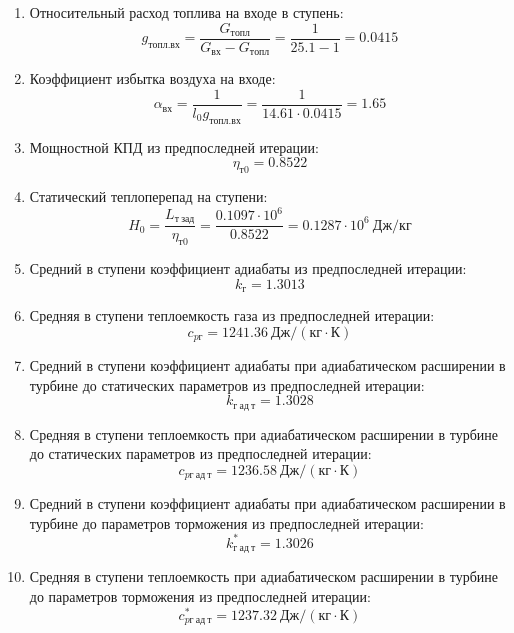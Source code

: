\documentclass[a4paper,10pt]{article}
\begin{document}
    

    \begin{enumerate}

        \item Относительный расход топлива на входе в ступень:
        \[
            g_{топл.вх} = \frac{ G_{топл} }{ G_{вх} - G_{топл} } =
                \frac{ 1 }{ 25.1 - 1 } =
            0.0415
        \]

        \item Коэффициент избытка воздуха на входе:
        \[
            \alpha_{вх} = \frac{ 1 }{ l_0 g_{топл.вх} } =
                \frac{ 1 }{ 14.61 \cdot 0.0415 } =
            1.65
        \]

        \item Мощностной КПД из предпоследней итерации:
        \[
            \eta_{т0} = 0.8522
        \]

        \item Статический теплоперепад на ступени:
        \[
            H_0 = \frac{L_{т\ зад}}{\eta_{т0}} =
                \frac{ 0.1097 \cdot 10^6 }{ 0.8522 } =
            0.1287 \cdot 10^6 \ Дж/кг
        \]

        \item Средний в ступени коэффициент адиабаты из предпоследней итерации:
        \[
            k_г = 1.3013
        \]

        \item Средняя в ступени теплоемкость газа из предпоследней итерации:
        \[
            c_{pг} = 1241.36 \ Дж/(кг \cdot К)
        \]

        \item Средний в ступени коэффициент адиабаты при адиабатическом расширении в турбине до статических параметров из предпоследней итерации:
        \[
            k_{г\ ад\ т} = 1.3028
        \]

        \item Средняя в ступени теплоемкость при адиабатическом расширении в турбине до статических параметров из предпоследней итерации:
        \[
            c_{pг\ ад\ т} = 1236.58 \ Дж/(кг \cdot К)
        \]

        \item Средний в ступени коэффициент адиабаты при адиабатическом расширении в турбине до параметров торможения из предпоследней итерации:
        \[
            k_{г\ ад\ т}^* = 1.3026
        \]

        \item Средняя в ступени теплоемкость при адиабатическом расширении в турбине до параметров торможения из предпоследней итерации:
        \[
            c_{pг\ ад\ т}^* = 1237.32 \ Дж/(кг \cdot К)
        \]


\end{enumerate}
\end{document}
